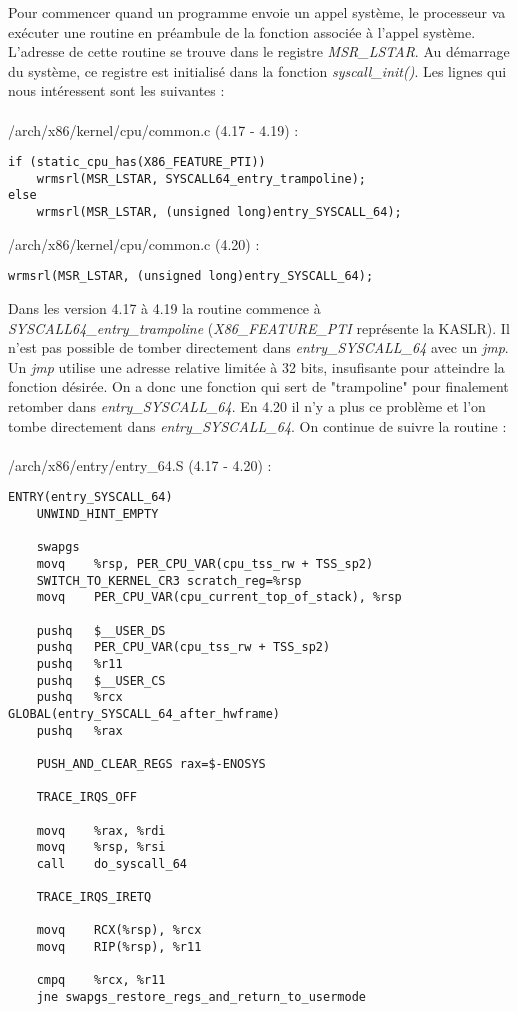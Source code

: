 \documentclass[journal, a4paper]{IEEEtran}
\begin{document}
Pour commencer quand un programme envoie un appel système, le processeur va exécuter une routine en préambule de la fonction associée à l'appel système. L'adresse de cette routine se trouve dans le registre \textit{MSR\_LSTAR}. Au démarrage du système, ce registre est initialisé dans la fonction \textit{syscall\_init()}. Les lignes qui nous intéressent sont les suivantes :
\\
\\
/arch/x86/kernel/cpu/common.c (4.17 - 4.19) :
\begin{lstlisting}[style=CStyle]
if (static_cpu_has(X86_FEATURE_PTI))
 	wrmsrl(MSR_LSTAR, SYSCALL64_entry_trampoline);
else
 	wrmsrl(MSR_LSTAR, (unsigned long)entry_SYSCALL_64);
\end{lstlisting}
/arch/x86/kernel/cpu/common.c (4.20) :
\begin{lstlisting}[style=CStyle]
wrmsrl(MSR_LSTAR, (unsigned long)entry_SYSCALL_64);
\end{lstlisting}
Dans les version 4.17 à 4.19 la routine commence à \textit{SYSCALL64\_entry\_trampoline} (\textit{X86\_FEATURE\_PTI} représente la KASLR). Il n'est pas possible de tomber directement dans \textit{entry\_SYSCALL\_64} avec un \textit{jmp}. Un \textit{jmp} utilise une adresse relative limitée à 32 bits, insufisante pour atteindre la fonction désirée. On a donc une fonction qui sert de "trampoline" pour finalement retomber dans \textit{entry\_SYSCALL\_64}. En 4.20 il n'y a plus ce problème et l'on tombe directement dans \textit{entry\_SYSCALL\_64}. On continue de suivre la routine :
\\
\\
/arch/x86/entry/entry\_64.S (4.17 - 4.20) :
\begin{lstlisting}[style=CStyle]
ENTRY(entry_SYSCALL_64)
	UNWIND_HINT_EMPTY

	swapgs
	movq	%rsp, PER_CPU_VAR(cpu_tss_rw + TSS_sp2)
	SWITCH_TO_KERNEL_CR3 scratch_reg=%rsp
	movq	PER_CPU_VAR(cpu_current_top_of_stack), %rsp

	pushq	$__USER_DS	
	pushq	PER_CPU_VAR(cpu_tss_rw + TSS_sp2)
	pushq	%r11	
	pushq	$__USER_CS
	pushq	%rcx	
GLOBAL(entry_SYSCALL_64_after_hwframe)
	pushq	%rax	

	PUSH_AND_CLEAR_REGS rax=$-ENOSYS

	TRACE_IRQS_OFF

	movq	%rax, %rdi
	movq	%rsp, %rsi
	call	do_syscall_64

	TRACE_IRQS_IRETQ

	movq	RCX(%rsp), %rcx
	movq	RIP(%rsp), %r11

	cmpq	%rcx, %r11
	jne	swapgs_restore_regs_and_return_to_usermode
\end{lstlisting}
\end{document}
